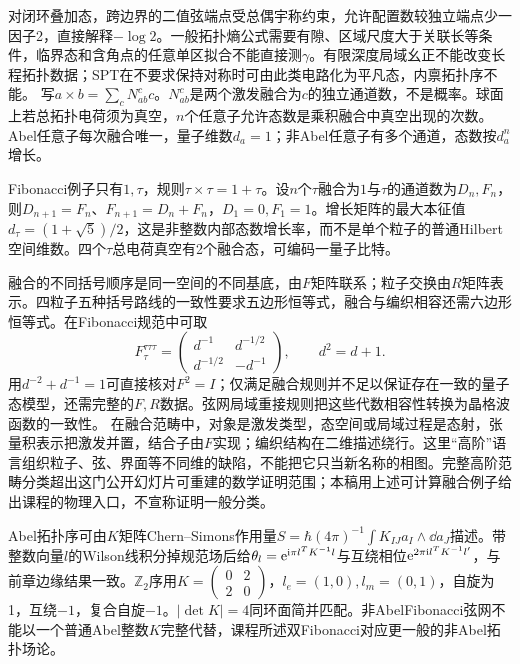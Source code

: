 对闭环叠加态，跨边界的二值弦端点受总偶宇称约束，允许配置数较独立端点少一因子2，直接解释$-\log2$。一般拓扑熵公式需要有隙、区域尺度大于关联长等条件，临界态和含角点的任意单区拟合不能直接测$\gamma$。有限深度局域幺正不能改变长程拓扑数据；SPT在不要求保持对称时可由此类电路化为平凡态，内禀拓扑序不能。
写$a\times b=\sum_cN_{ab}^{c}c$。$N_{ab}^{c}$是两个激发融合为$c$的独立通道数，不是概率。球面上若总拓扑电荷须为真空，$n$个任意子允许态数是乘积融合中真空出现的次数。Abel任意子每次融合唯一，量子维数$d_a=1$；非Abel任意子有多个通道，态数按$d_a^n$增长。

Fibonacci例子只有$1,\tau$，规则$\tau\times\tau=1+\tau$。设$n$个$\tau$融合为$1$与$\tau$的通道数为$D_n,F_n$，则$D_{n+1}=F_n$、$F_{n+1}=D_n+F_n$，$D_1=0,F_1=1$。增长矩阵的最大本征值$d_\tau=(1+\sqrt5)/2$，这是非整数内部态数增长率，而不是单个粒子的普通Hilbert空间维数。四个$\tau$总电荷真空有2个融合态，可编码一量子比特。

融合的不同括号顺序是同一空间的不同基底，由$F$矩阵联系；粒子交换由$R$矩阵表示。四粒子五种括号路线的一致性要求五边形恒等式，融合与编织相容还需六边形恒等式。在Fibonacci规范中可取
\begin{equation}
F_{\tau}^{\tau\tau\tau}=\begin{pmatrix}d^{-1}&d^{-1/2}\\d^{-1/2}&-d^{-1}\end{pmatrix},\qquad d^2=d+1.
\end{equation}
用$d^{-2}+d^{-1}=1$可直接核对$F^2=I$；仅满足融合规则并不足以保证存在一致的量子态模型，还需完整的$F,R$数据。弦网局域重接规则把这些代数相容性转换为晶格波函数的一致性。
在融合范畴中，对象是激发类型，态空间或局域过程是态射，张量积表示把激发并置，结合子由$F$实现；编织结构在二维描述绕行。这里“高阶”语言组织粒子、弦、界面等不同维的缺陷，不能把它只当新名称的相图。完整高阶范畴分类超出这门公开幻灯片可重建的数学证明范围；本稿用上述可计算融合例子给出课程的物理入口，不宣称证明一般分类。

Abel拓扑序可由$K$矩阵Chern--Simons作用量$S=\hbar(4\pi)^{-1}\int K_{IJ}a_I\wedge\dd a_J$描述。带整数向量$l$的Wilson线积分掉规范场后给$\theta_l=\mathrm e^{\mathrm i\pi l^TK^{-1}l}$与互绕相位$\mathrm e^{2\pi\mathrm i l^TK^{-1}l'}$，与前章边缘结果一致。$\mathbb Z_2$序用$K=\left(\begin{smallmatrix}0&2\\2&0\end{smallmatrix}\right)$，$l_e=(1,0),l_m=(0,1)$，自旋为1，互绕$-1$，复合自旋$-1$。$|\det K|=4$同环面简并匹配。非AbelFibonacci弦网不能以一个普通Abel整数$K$完整代替，课程所述双Fibonacci对应更一般的非Abel拓扑场论。
